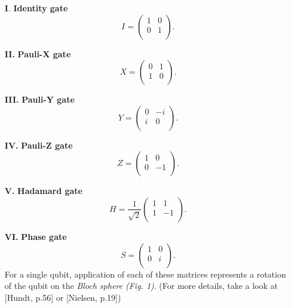 \documentclass[onecolumn,10pt,cleanfoot]{asme2ej}
\begin{document}
\begin{enumerate}
	\item[\textbf{I}.] \textbf{Identity gate}
		\begin{equation*}
			I = \begin{pmatrix}
			1 & 0 \\
			0 & 1 \\
		\end{pmatrix}.
	\end{equation*}

	\item[\textbf{II.}] \textbf{Pauli-X gate}
		\begin{equation*}
			X = \begin{pmatrix}
			0 & 1 \\
			1 & 0 \\
		\end{pmatrix}.
	\end{equation*}

	\item[\textbf{III.}] \textbf{Pauli-Y gate}
		\begin{equation*}
			Y = \begin{pmatrix}
			0 & -i \\
			i & 0 \\
		\end{pmatrix}.
	\end{equation*}

	\item[\textbf{IV.}] \textbf{Pauli-Z gate}
		\begin{equation*}
			Z = \begin{pmatrix}
			1 & 0 \\
			0 & -1 \\
		\end{pmatrix}.
	\end{equation*}

	\item[\textbf{V.}] \textbf{Hadamard gate}
		\begin{equation*}
			H = \frac{1}{\sqrt{2}} \begin{pmatrix}
			1 & 1 \\
			1 & -1 \\
		\end{pmatrix}.
	\end{equation*}

	\item[\textbf{VI.}] \textbf{Phase gate}
		\begin{equation*}
			S = \begin{pmatrix}
			1 & 0 \\
			0 & i \\
		\end{pmatrix}.
	\end{equation*}
		For a single qubit, application of each of these matrices represents a rotation of the qubit on the \textit{Bloch sphere (Fig. 1)}. (For more details, take a look at [Hundt, p.56] or [Nielsen, p.19])


\end{enumerate}
\end{document}
